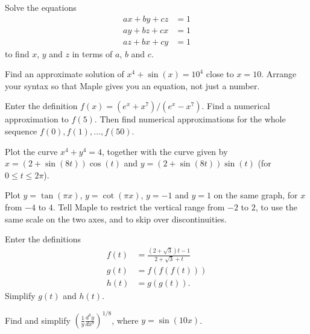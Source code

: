 \documentclass[a4paper,10pt]{amsbook}
\begin{document}
\begin{exercise}
 Solve the equations
 \begin{align*}
  ax+by+cz &= 1 \\
  ay+bz+cx &= 1 \\
  az+bx+cy &= 1
 \end{align*}
 to find $x$, $y$ and $z$ in terms of $a$, $b$ and $c$.
\end{exercise}

\begin{exercise}
 Find an approximate solution of $x^4+\sin(x)=10^4$ close
 to $x=10$.  Arrange your syntax so that Maple gives you an
 equation, not just a number.
\end{exercise}

\begin{exercise}
 Enter the definition $f(x)=(e^x+x^7)/(e^x-x^7)$.  Find
 a numerical approximation to $f(5)$.  Then find numerical
 approximations for the whole sequence
 $f(0),f(1),\dotsc,f(50)$. 
\end{exercise}

\begin{exercise}
 Plot the curve $x^4+y^4=4$, together with the curve given
 by $x=(2+\sin(8t))\cos(t)$ and $y=(2+\sin(8t))\sin(t)$ (for
 $0\leq t\leq 2\pi$).
\end{exercise}

\begin{exercise}
 Plot $y=\tan(\pi x)$, $y=\cot(\pi x)$, $y=-1$ and $y=1$ on
 the same graph, for $x$ from $-4$ to $4$.  Tell Maple to
 restrict the vertical range from $-2$ to $2$, to use the
 same scale on the two axes, and to skip over
 discontinuities.
\end{exercise}

\begin{exercise}
 Enter the definitions
 \begin{align*}
  f(t) &= \frac{(2+\sqrt{3})t-1}{2+\sqrt{3}+t} \\
  g(t) &= f(f(f(t))) \\
  h(t) &= g(g(t)).
 \end{align*}
 Simplify $g(t)$ and $h(t)$.
\end{exercise}

\begin{exercise}
 Find and simplify $\displaystyle
 \left(\frac{1}{y}\frac{d^8y}{dx^8}\right)^{1/8}$, where
 $y=\sin(10x)$. 
\end{exercise}

\end{document}
